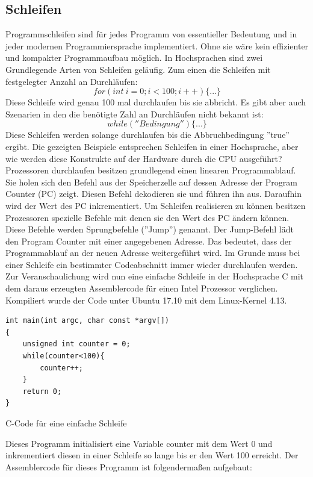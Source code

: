 \documentclass[12pt]{article}
\begin{document}
\subsection{Schleifen}
Programmschleifen sind für jedes Programm von essentieller Bedeutung und in jeder modernen Programmiersprache implementiert. Ohne sie wäre kein effizienter und kompakter Programmaufbau möglich. In Hochsprachen sind zwei Grundlegende Arten von Schleifen geläufig. Zum einen die Schleifen mit festgelegter Anzahl an Durchläufen: 
$$for(int \ i=0; i<100; i++)\{...\}$$
Diese Schleife wird genau 100 mal durchlaufen bis sie abbricht. Es gibt aber auch Szenarien in den die benötigte Zahl an Durchläufen nicht bekannt ist:
$$while(''Bedingung'')\{...\}$$
Diese Schleifen werden solange durchlaufen bis die Abbruchbedingung ''true'' ergibt. Die gezeigten Beispiele entsprechen Schleifen in einer Hochsprache, aber wie werden diese Konstrukte auf der Hardware durch die CPU ausgeführt?
Prozessoren durchlaufen besitzen grundlegend einen linearen Programmablauf. Sie holen sich den Befehl aus der Speicherzelle auf dessen Adresse der Program Counter (PC) zeigt. Diesen Befehl dekodieren sie und führen ihn aus. Daraufhin wird der Wert des PC inkrementiert. Um Schleifen realisieren zu können besitzen Prozessoren spezielle Befehle mit denen sie den Wert des PC ändern können. Diese Befehle werden Sprungbefehle (''Jump'') genannt. Der Jump-Befehl lädt den Program Counter mit einer angegebenen Adresse. Das bedeutet, dass der Programmablauf an der neuen Adresse weitergeführt wird. Im Grunde muss bei einer Schleife ein bestimmter Codeabschnitt immer wieder durchlaufen werden. Zur Veranschaulichung wird nun eine einfache Schleife in der Hochsprache C mit dem daraus erzeugten Assemblercode für einen Intel Prozessor verglichen. Kompiliert wurde der Code unter Ubuntu 17.10 mit dem Linux-Kernel 4.13.

\begin{code}[!htb]
\begin{lstlisting}
int main(int argc, char const *argv[])
{
	unsigned int counter = 0;
	while(counter<100){
		counter++;
	}
	return 0;
}
\end{lstlisting}
\caption[C Code einfache Schleife]{C-Code für eine einfache Schleife}
\end{code}

\noindent Dieses Programm initialisiert eine Variable counter mit dem Wert 0 und inkrementiert diesen in einer Schleife so lange bis er den Wert 100 erreicht. Der Assemblercode für dieses Programm ist folgendermaßen aufgebaut:
\end{document}
